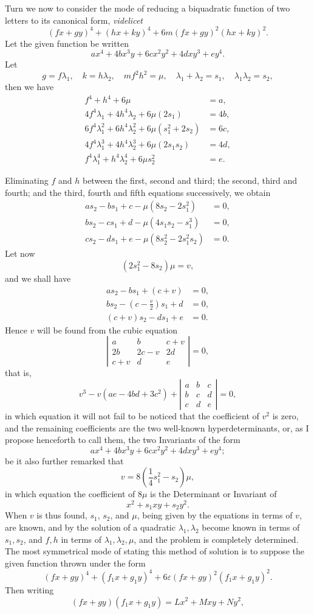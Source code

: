 \documentclass[11pt]{article}
\newcommand{\sourcepage}[1]{\marginpar{\scriptsize p.~#1}}
\begin{document}
Turn we now to consider the mode of reducing a biquadratic function of two letters to its canonical form, \emph{videlicet}
\[
(fx+gy)^4+(hx+ky)^4+6m(fx+gy)^2(hx+ky)^2.
\]
Let the given function be written
\[
ax^4+4bx^3y+6cx^2y^2+4dxy^3+ey^4.
\]
Let
\[
g=f\lambda_1,\quad k=h\lambda_2,\quad mf^2h^2=\mu,\quad
\lambda_1+\lambda_2=s_1,\quad \lambda_1\lambda_2=s_2,
\]
then we have
\[
\begin{aligned}
f^4+h^4+6\mu&=a,\\
4f^4\lambda_1+4h^4\lambda_2+6\mu(2s_1)&=4b,\\
6f^4\lambda_1^2+6h^4\lambda_2^2+6\mu(s_1^2+2s_2)&=6c,\\
4f^4\lambda_1^3+4h^4\lambda_2^3+6\mu(2s_1s_2)&=4d,\\
f^4\lambda_1^4+h^4\lambda_2^4+6\mu s_2^2&=e.
\end{aligned}
\]

\sourcepage{270}
Eliminating $f$ and $h$ between the first, second and third; the second, third and fourth; and the third, fourth and fifth equations successively, we obtain
\[
\begin{aligned}
as_2-bs_1+c-\mu(8s_2-2s_1^2)&=0,\\
bs_2-cs_1+d-\mu(4s_1s_2-s_1^3)&=0,\\
cs_2-ds_1+e-\mu(8s_2^2-2s_1^2s_2)&=0.
\end{aligned}
\]
Let now
\[
(2s_1^2-8s_2)\mu=v,
\]
and we shall have
\[
\begin{aligned}
as_2-bs_1+(c+v)&=0,\\
bs_2-\left(c-\frac{v}{2}\right)s_1+d&=0,\\
(c+v)s_2-ds_1+e&=0.
\end{aligned}
\]
Hence $v$ will be found from the cubic equation
\[
\left|\begin{array}{ccc}
a&b&c+v\\
2b&2c-v&2d\\
c+v&d&e
\end{array}\right|=0,
\]
that is,
\[
v^3-v(ae-4bd+3c^2)+
\left|\begin{array}{ccc}
a&b&c\\
b&c&d\\
c&d&e
\end{array}\right|=0,
\]
in which equation it will not fail to be noticed that the coefficient of $v^2$ is zero, and the remaining coefficients are the two well-known hyperdeterminants, or, as I propose henceforth to call them, the two Invariants of the form
\[
ax^4+4bx^3y+6cx^2y^2+4dxy^3+ey^4;
\]
be it also further remarked that
\[
v=8\left(\frac14s_1^2-s_2\right)\mu,
\]
in which equation the coefficient of $8\mu$ is the Determinant or Invariant of
\[
x^2+s_1xy+s_2y^2.
\]
When $v$ is thus found, $s_1$, $s_2$, and $\mu$, being given by the equations in terms of $v$, are known, and by the solution of a quadratic $\lambda_1,\lambda_2$ become known in terms of $s_1,s_2$, and $f,h$ in terms of $\lambda_1,\lambda_2,\mu$, and the problem is completely determined. The most symmetrical mode of stating this method of solution is to suppose the given function thrown under the form
\[
(fx+gy)^4+(f_1x+g_1y)^4+6\varepsilon(fx+gy)^2(f_1x+g_1y)^2.
\]
Then writing
\[
(fx+gy)(f_1x+g_1y)=Lx^2+Mxy+Ny^2,
\]
\end{document}
